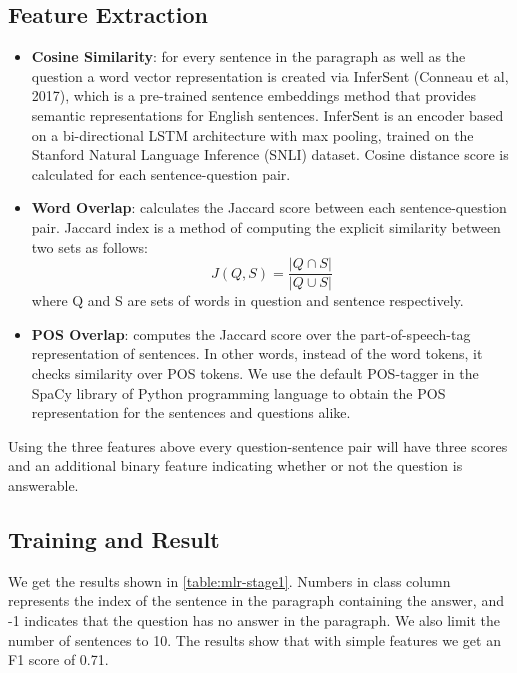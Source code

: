 \subsection{Feature Extraction} 
\begin{itemize}
\item \textbf{Cosine Similarity}: for every sentence in the paragraph as well as the question a word vector representation is created via InferSent (Conneau et al, 2017), which is a pre-trained sentence embeddings method that provides semantic representations for English sentences. InferSent is an encoder based on a bi-directional LSTM architecture with max pooling, trained on the Stanford Natural Language Inference (SNLI) dataset. Cosine distance score is calculated for each sentence-question pair. 
\item \textbf{Word Overlap}: calculates the Jaccard score between each sentence-question pair. Jaccard index is a method of computing the explicit similarity between two sets as follows: 
$$
J(Q,S) = \frac{|Q \cap S|}{|Q \cup S|}
$$
where Q and S are sets of words in question and sentence respectively.

\item \textbf{POS Overlap}: computes the Jaccard score over the part-of-speech-tag representation of sentences. In other words, instead of the word tokens, it checks similarity over POS tokens. We use the default POS-tagger in the SpaCy library of Python programming language to obtain the POS representation for the sentences and questions alike.
\end{itemize}
Using the three features above every question-sentence pair will have three scores and an additional binary feature indicating whether or not the question is answerable. 

\subsection{Training and Result} 
 We get the results shown in \ref{table:mlr-stage1}. Numbers in class column represents the index of the sentence in the paragraph containing the answer, and -1 indicates that the question has no answer in the paragraph. We also limit the number of sentences to 10. The results show that with simple features we get an F1 score of 0.71.

